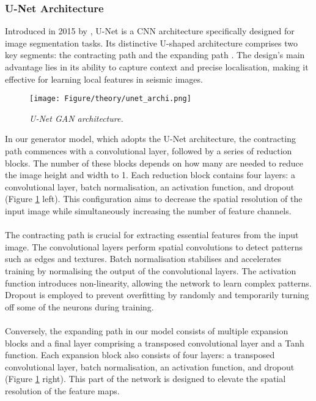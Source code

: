 \subsubsection{U-Net Architecture} \label{subsec:unet_archi}
Introduced in 2015 by \citeauthor{ronneberger2015u}, U-Net is a CNN architecture specifically designed for image segmentation tasks. Its distinctive U-shaped architecture comprises two key segments: the contracting path and the expanding path \cite{ronneberger2015u, long2015fully}. The design's main advantage lies in its ability to capture context and precise localisation, making it effective for learning local features in seismic images.
\\

\begin{figure}[h]
	\centering
	\texttt{[image: Figure/theory/unet\_archi.png]} %
	\caption{\textit{U-Net GAN architecture.}}
	\label{fig:unet_archi}
\end{figure}
\noindent In our generator model, which adopts the U-Net architecture, the contracting path commences with a convolutional layer, followed by a series of reduction blocks. The number of these blocks depends on how many are needed to reduce the image height and width to 1. Each reduction block contains four layers: a convolutional layer, batch normalisation, an activation function, and dropout (Figure \ref{fig:unet_archi} left). This configuration aims to decrease the spatial resolution of the input image while simultaneously increasing the number of feature channels. 
\\\\
The contracting path is crucial for extracting essential features from the input image. The convolutional layers perform spatial convolutions to detect patterns such as edges and textures. Batch normalisation stabilises and accelerates training by normalising the output of the convolutional layers. The activation function introduces non-linearity, allowing the network to learn complex patterns. Dropout is employed to prevent overfitting by randomly and temporarily turning off some of the neurons during training.
\\\\
Conversely, the expanding path in our model consists of multiple expansion blocks and a final layer comprising a transposed convolutional layer and a Tanh function. Each expansion block also consists of four layers: a transposed convolutional layer, batch normalisation, an activation function, and dropout (Figure \ref{fig:unet_archi} right). This part of the network is designed to elevate the spatial resolution of the feature maps. 
